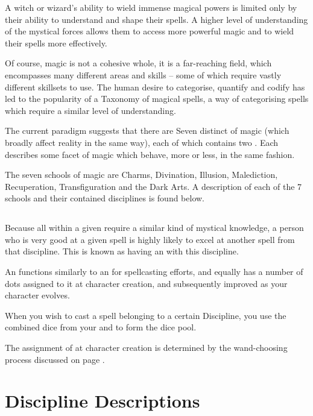 A witch or wizard's ability to wield immense magical powers is limited only by their ability to understand and shape their spells. A higher level of understanding of the mystical forces allows them to access more powerful magic and to wield their spells more effectively. 

Of course, magic is not a cohesive whole, it is a far-reaching field, which encompasses many different areas and skills -- some of which require vastly different skillsets to use. The human desire to categorise, quantify and codify has led to the popularity of a Taxonomy of magical spells, a way of categorising spells which require a similar level of understanding. 

The current paradigm suggests that there are Seven distinct  of magic (which broadly affect reality in the same way), each of which contains two . Each  describes some facet of magic which behave, more or less, in the same fashion.

The seven schools of magic are Charms, Divination, Illusion, Malediction, Recuperation, Transfiguration and the Dark Arts. A description of each of the 7 schools and their contained disciplines is found below.

\subsection{}\label{S:Affinities}
Because all  within a given  require a similar kind of mystical knowledge, a person who is very good at a given  spell is highly likely to excel at another spell from that discipline. This is known as having an  with this discipline. 

An  functions similarly to an  for spellcasting efforts, and equally has a number of dots assigned to it at character creation, and subsequently improved as your character evolves. 

When you wish to cast a spell belonging to a certain Discipline, you use the combined dice from your  and  to form the dice pool. 

The assignment of  at character creation is determined by the wand-choosing process discussed on page \pageref{S:Wandchoosing}.


\section{Discipline Descriptions}\label{S:DiscDescs}

